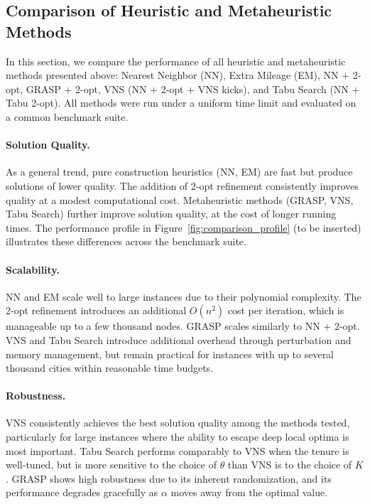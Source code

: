 \documentclass{article}
\begin{document}
\subsection{Comparison of Heuristic and Metaheuristic Methods}

In this section, we compare the performance of all heuristic and metaheuristic methods
presented above: Nearest Neighbor (NN), Extra Mileage (EM), NN + 2-opt, GRASP + 2-opt,
VNS (NN + 2-opt + VNS kicks), and Tabu Search (NN + Tabu 2-opt). All methods were run under
a uniform time limit and evaluated on a common benchmark suite.

\paragraph{Solution Quality.}
As a general trend, pure construction heuristics (NN, EM) are fast but produce solutions
of lower quality. The addition of 2-opt refinement consistently improves quality at a modest
computational cost. Metaheuristic methods (GRASP, VNS, Tabu Search) further improve solution
quality, at the cost of longer running times. The performance profile in
Figure~\ref{fig:comparison_profile} (to be inserted) illustrates these differences across
the benchmark suite.

\paragraph{Scalability.}
NN and EM scale well to large instances due to their polynomial complexity. The 2-opt
refinement introduces an additional $O(n^2)$ cost per iteration, which is manageable up to
a few thousand nodes. GRASP scales similarly to NN + 2-opt. VNS and Tabu Search introduce
additional overhead through perturbation and memory management, but remain practical for
instances with up to several thousand cities within reasonable time budgets.

\paragraph{Robustness.}
VNS consistently achieves the best solution quality among the methods tested, particularly
for large instances where the ability to escape deep local optima is most important. Tabu
Search performs comparably to VNS when the tenure is well-tuned, but is more sensitive to
the choice of $\theta$ than VNS is to the choice of $K$. GRASP shows high robustness due to
its inherent randomization, and its performance degrades gracefully as $\alpha$ moves away
from the optimal value.
\end{document}
